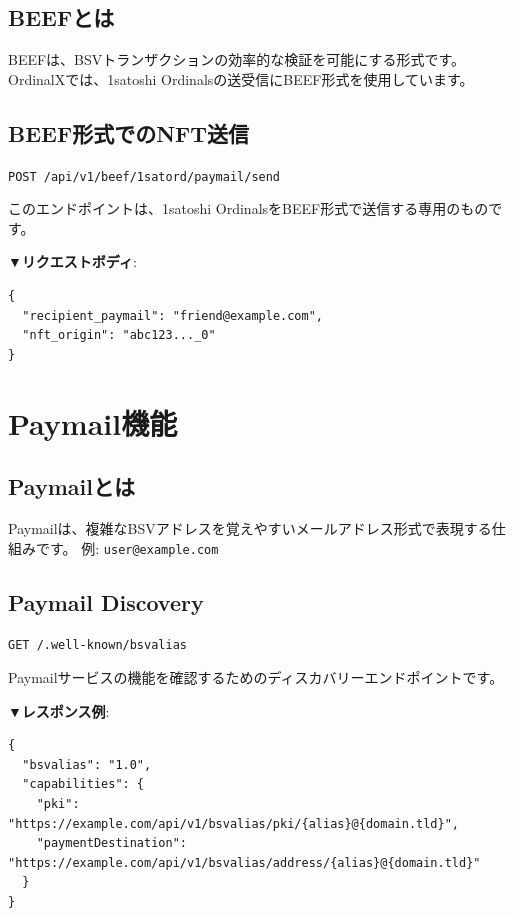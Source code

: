\documentclass[11pt,a4paper]{ltjsarticle}  %
\begin{document}
\subsection{BEEFとは}
BEEFは、BSVトランザクションの効率的な検証を可能にする形式です。
OrdinalXでは、1satoshi Ordinalsの送受信にBEEF形式を使用しています。

\subsection{BEEF形式でのNFT送信}

\begin{tcolorbox}[colback=blue!5,colframe=blue!50!black,title=エンドポイント]
\texttt{POST /api/v1/beef/1satord/paymail/send}
\end{tcolorbox}

このエンドポイントは、1satoshi OrdinalsをBEEF形式で送信する専用のものです。

\textbf{▼リクエストボディ}:
\begin{lstlisting}[style=json]
{
  "recipient_paymail": "friend@example.com",
  "nft_origin": "abc123..._0"
}
\end{lstlisting}

\section{Paymail機能}

\subsection{Paymailとは}
Paymailは、複雑なBSVアドレスを覚えやすいメールアドレス形式で表現する仕組みです。
例: \texttt{user@example.com}

\subsection{Paymail Discovery}

\begin{tcolorbox}[colback=blue!5,colframe=blue!50!black,title=エンドポイント]
\texttt{GET /.well-known/bsvalias}
\end{tcolorbox}

Paymailサービスの機能を確認するためのディスカバリーエンドポイントです。

\textbf{▼レスポンス例}:
\begin{lstlisting}[style=json]
{
  "bsvalias": "1.0",
  "capabilities": {
    "pki": "https://example.com/api/v1/bsvalias/pki/{alias}@{domain.tld}",
    "paymentDestination": "https://example.com/api/v1/bsvalias/address/{alias}@{domain.tld}"
  }
}
\end{lstlisting}
\end{document}
